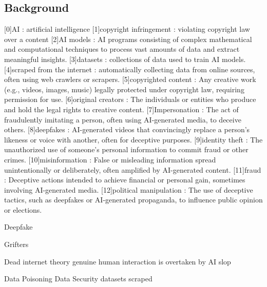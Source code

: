 \subsection{Background}
\label{subsection:Background}
[0]AI : artificial intelligence
[1]copyright infringement : violating copyright law over a content
[2]AI models : AI programs consisting of complex mathematical and computational techniques to process vast amounts of data and extract meaningful insights.
[3]datasets : collections of data used to train AI models.
[4]scraped from the internet : automatically collecting data from online sources, often using web crawlers or scrapers.
[5]copyrighted content : Any creative work (e.g., videos, images, music) legally protected under copyright law, requiring permission for use.
[6]original creators : The individuals or entities who produce and hold the legal rights to creative content.
[7]Impersonation : The act of fraudulently imitating a person, often using AI-generated media, to deceive others.
[8]deepfakes : AI-generated videos that convincingly replace a person’s likeness or voice with another, often for deceptive purposes.
[9]identity theft : The unauthorized use of someone’s personal information to commit fraud or other crimes.
[10]misinformation : False or misleading information spread unintentionally or deliberately, often amplified by AI-generated content.
[11]fraud : Deceptive actions intended to achieve financial or personal gain, sometimes involving AI-generated media.
[12]political manipulation : The use of deceptive tactics, such as deepfakes or AI-generated propaganda, to influence public opinion or elections.

Deepfake

Grifters

Dead internet theory
    genuine human interaction is overtaken by AI slop

Data Poisoning
Data Security
datasets
scraped
